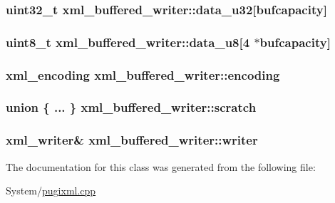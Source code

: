 \hypertarget{classxml__buffered__writer_afa54826d8227c4ee661e1a9cc1e1acf2}{
\subsubsection[{data\-\_\-u32}]{\setlength{\rightskip}{0pt plus 5cm}uint32\-\_\-t xml\-\_\-buffered\-\_\-writer\-::data\-\_\-u32\mbox{[}{\bf bufcapacity}\mbox{]}}}\label{classxml__buffered__writer_afa54826d8227c4ee661e1a9cc1e1acf2}
\hypertarget{classxml__buffered__writer_ac672c70ba0597cf94d35c352ac563891}{
\subsubsection[{data\-\_\-u8}]{\setlength{\rightskip}{0pt plus 5cm}uint8\-\_\-t xml\-\_\-buffered\-\_\-writer\-::data\-\_\-u8\mbox{[}4 $\ast${\bf bufcapacity}\mbox{]}}}\label{classxml__buffered__writer_ac672c70ba0597cf94d35c352ac563891}
\hypertarget{classxml__buffered__writer_ab810a7286598172e1549561b285f08fb}{
\subsubsection[{encoding}]{\setlength{\rightskip}{0pt plus 5cm}xml\-\_\-encoding xml\-\_\-buffered\-\_\-writer\-::encoding}}\label{classxml__buffered__writer_ab810a7286598172e1549561b285f08fb}
\hypertarget{classxml__buffered__writer_a74fd3d695095835afa0f7671ac33037c}{
\subsubsection[{scratch}]{\setlength{\rightskip}{0pt plus 5cm}union \{ ... \}   xml\-\_\-buffered\-\_\-writer\-::scratch}}\label{classxml__buffered__writer_a74fd3d695095835afa0f7671ac33037c}
\hypertarget{classxml__buffered__writer_a37cdd45f867937e1978565f5a0fa318b}{
\subsubsection[{writer}]{\setlength{\rightskip}{0pt plus 5cm}xml\-\_\-writer\& xml\-\_\-buffered\-\_\-writer\-::writer}}\label{classxml__buffered__writer_a37cdd45f867937e1978565f5a0fa318b}


The documentation for this class was generated from the following file\-:\begin{DoxyCompactItemize}
\item 
System/\hyperlink{pugixml_8cpp}{pugixml.\-cpp}\end{DoxyCompactItemize}
